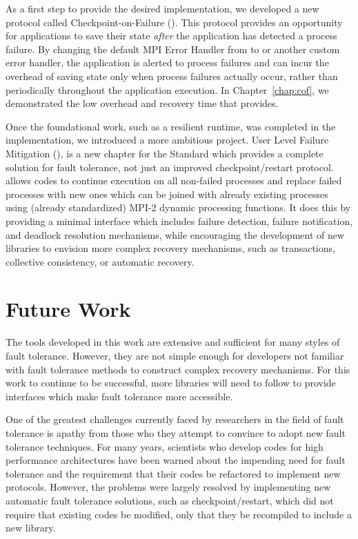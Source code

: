 As a first step to provide the desired \mpi implementation, we developed a new 
protocol called Checkpoint-on-Failure (\cof). This protocol provides an 
opportunity for applications to save their state \textit{after} the application 
has detected a process failure. By changing the default MPI Error Handler from 
 to  or another custom 
error handler, the application is alerted to process failures and can incur the 
overhead of saving state only when process failures actually occur, rather than 
periodically throughout the application execution. In Chapter~\ref{chap:cof}, we 
demonstrated the low overhead and recovery time that \cof provides.

Once the foundational work, such as a resilient runtime, was completed in the 
\cof implementation, we introduced a more ambitious project. User Level Failure 
Mitigation (\ulfm), is a new chapter for the \mpi Standard which provides a 
complete solution for fault tolerance, not just an improved checkpoint/restart 
protocol. \ulfm allows \abft codes to continue execution on all non-failed 
processes and replace failed processes with new ones which can be joined with 
already existing processes using (already standardized) MPI-2 dynamic processing 
functions. It does this by providing a minimal interface which includes failure 
detection, failure notification, and deadlock resolution mechanisms, while 
encouraging the development of new libraries to envision more complex recovery 
mechanisms, such as transactions, collective consistency, or automatic recovery.

\section{Future Work}
\label{chap:conclusions:future}

The tools developed in this work are extensive and sufficient for many styles of 
fault tolerance. However, they are not simple enough for developers not 
familiar with fault tolerance methods to construct complex recovery mechanisms. 
For this work to continue to be successful, more libraries will need to follow to 
provide interfaces which make fault tolerance more accessible.

One of the greatest challenges currently faced by researchers in the field of 
fault tolerance is apathy from those who they attempt to convince to adopt new fault 
tolerance techniques. For many years, scientists who develop codes for high 
performance architectures have been warned about the impending need for fault 
tolerance and the requirement that their codes be refactored to implement new 
protocols. However, the problems were largely resolved by implementing new 
automatic fault tolerance solutions, such as checkpoint/restart, which did not 
require that existing codes be modified, only that they be recompiled to include 
a new library.

